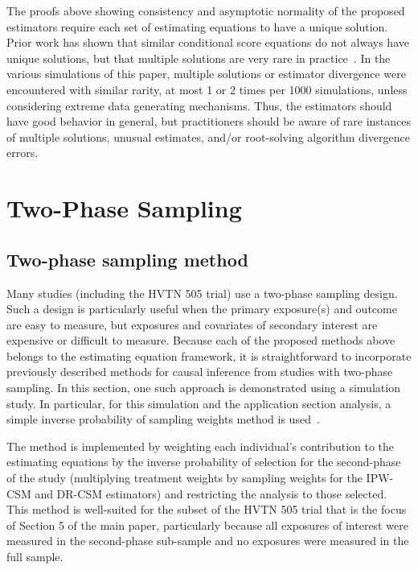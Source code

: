 \documentclass[12pt]{article}
\begin{document}
The proofs above showing consistency and asymptotic normality of the proposed estimators require each set of estimating equations to have a unique solution. Prior work has shown that similar conditional score equations do not always have unique solutions, but that multiple solutions are very rare in practice~\citep{stefanski1987}. In the various simulations of this paper, multiple solutions or estimator divergence were encountered with similar rarity, at most 1 or 2 times per 1000 simulations, unless considering extreme data generating mechanisms. Thus, the estimators should have good behavior in general, but practitioners should be aware of rare instances of multiple solutions, unusual estimates, and/or root-solving algorithm divergence errors.

\section{Two-Phase Sampling}

\subsection{Two-phase sampling method}

Many studies (including the HVTN 505 trial) use a two-phase sampling design. Such a design is particularly useful when the primary exposure(s) and outcome are easy to measure, but exposures and covariates of secondary interest are expensive or difficult to measure. Because each of the proposed methods above belongs to the estimating equation framework, it is straightforward to incorporate previously described methods for causal inference from studies with two-phase sampling. In this section, one such approach is demonstrated using a simulation study. In particular, for this simulation and the application section analysis, a simple inverse probability of sampling weights method is used~\citep{wang2009}.

The method is implemented by weighting each individual's contribution to the estimating equations by the inverse probability of selection for the second-phase of the study (multiplying treatment weights by sampling weights for the IPW-CSM and DR-CSM estimators) and restricting the analysis to those selected. This method is well-suited for the subset of the HVTN 505 trial that is the focus of Section 5 of the main paper, particularly because all exposures of interest were measured in the second-phase sub-sample and no exposures were measured in the full sample.
\end{document}

